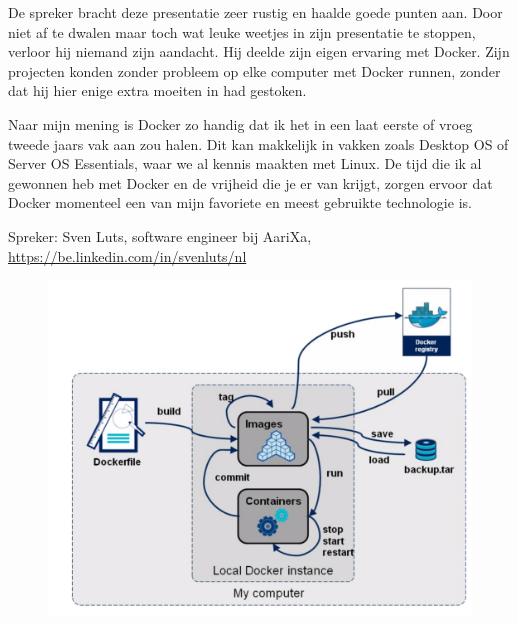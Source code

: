 De spreker bracht deze presentatie zeer rustig en haalde goede punten aan. Door niet af te dwalen maar toch wat leuke weetjes in zijn presentatie te stoppen, verloor hij niemand zijn aandacht. Hij deelde zijn eigen ervaring met Docker. Zijn projecten konden zonder probleem op elke computer met Docker runnen, zonder dat hij hier enige extra moeiten in had gestoken.

Naar mijn mening is Docker zo handig dat ik het in een laat eerste of vroeg tweede jaars vak aan zou halen. Dit kan makkelijk in vakken zoals Desktop OS of Server OS Essentials, waar we al kennis maakten met Linux. De tijd die ik al gewonnen heb met Docker en de vrijheid die je er van krijgt, zorgen ervoor dat Docker momenteel een van mijn favoriete en meest gebruikte technologie is.

Spreker: Sven Luts, software engineer bij AariXa, \url{https://be.linkedin.com/in/svenluts/nl}


\begin{figure}[!h]
  \centering
  \includegraphics[width=0.74\linewidth]{images/docker/flow.png}
\end{figure}